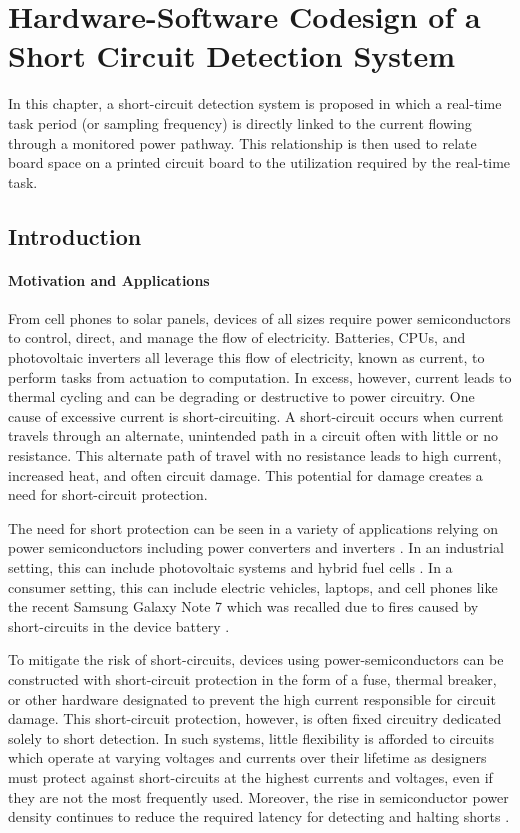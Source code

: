 \section{Hardware-Software Codesign of a Short Circuit Detection System}   \label{chap:scd}

In this chapter, a short-circuit detection system is proposed in which a real-time task period (or sampling frequency) is directly linked to the current flowing through a monitored power pathway.
This relationship is then used to relate board space on a printed circuit board to the utilization required by the real-time task.

\subsection{Introduction}   \label{subsec:hardwareSoftwarreCodesign}

\paragraph{Motivation and Applications}
From cell phones to solar panels, devices of all sizes require power semiconductors to control, direct, and manage the flow of electricity.
Batteries, CPUs, and photovoltaic inverters all leverage this flow of electricity, known as current, to perform tasks from actuation to computation.
In excess, however, current leads to thermal cycling and can be degrading or destructive to power circuitry.
One cause of excessive current is short-circuiting.
A short-circuit occurs when current travels through an alternate, unintended path in a circuit often with little or no resistance.
This alternate path of travel with no resistance leads to high current, increased heat, and often circuit damage.
This potential for damage creates a need for short-circuit protection.

The need for short protection can be seen in a variety of applications relying on power semiconductors including power converters and inverters \cite{horiguchi_high-speed_2015}.
In an industrial setting, this can include photovoltaic systems and hybrid fuel cells \cite{zhang_model-based_2011}. 
In a consumer setting, this can include electric vehicles, laptops, and cell phones like the recent Samsung Galaxy Note 7 which was recalled due to fires caused by short-circuits in the device battery \cite{hollister_heres_2016}.

To mitigate the risk of short-circuits, devices using power-semiconductors can be constructed with short-circuit protection in the form of a fuse, thermal breaker, or other hardware designated to prevent the high current responsible for circuit damage. 
This short-circuit protection, however, is often fixed circuitry dedicated solely to short detection. In such systems, little flexibility is afforded to circuits which operate at varying voltages and currents over their lifetime as designers must protect against short-circuits at the highest currents and voltages, even if they are not the most frequently used. Moreover, the rise in semiconductor power density continues to reduce the required latency for detecting and halting shorts \cite{horiguchi_short_2014}.

